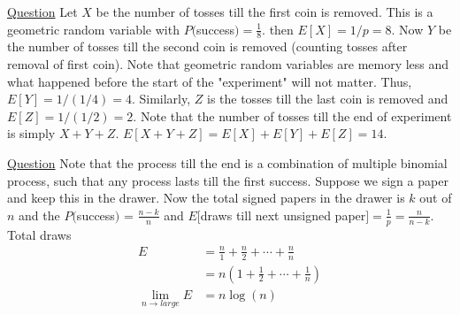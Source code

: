 \documentclass[11pt, a4paper]{article}
\begin{document}
\begin{enumerate}
\begin{enumerate}
        \end{enumerate}


        \hypertarget{a_linexp}{\item} \hyperlink{q_linexp}{Question}\newline
        Let $X$ be the number of tosses till the first coin is removed. This is a geometric random variable with $P($success$) = \frac{1}{8}$. then $E[X] = 1/p = 8$. Now $Y$ be the number of tosses till the second coin is removed (counting tosses after removal of first coin). Note that geometric random variables are memory less and what happened before the start of the "experiment" will not matter. Thus, $E[Y] = 1/(1/4) = 4$. Similarly, $Z$ is the tosses till the last coin is removed and $E[Z] = 1/(1/2) = 2$. Note that the number of tosses till the end of experiment is simply $X + Y + Z$. $E[X+Y+Z] = E[X] + E[Y] + E[Z] = 14$.


        \hypertarget{a_papers}{\item} \hyperlink{q_papers}{Question}\newline
        Note that the process till the end is a combination of multiple binomial process, such that any process lasts till the first success. Suppose we sign a paper and keep this in the drawer. Now the total signed papers in the drawer is $k$ out of $n$ and the $P($success$)$ = $\frac{n-k}{n}$ and $E[$draws till next unsigned paper$] = \frac{1}{p} = \frac{n}{n-k}$. Total draws
        \begin{align*}
            E &= \frac{n}{1} + \frac{n}{2} + \cdots + \frac{n}{n}\\
             &= n(1 + \frac{1}{2} + \cdots + \frac{1}{n})\\
            \lim_{n \to large} E &= n \log(n) 
        \end{align*}



\end{enumerate}
\end{document}
